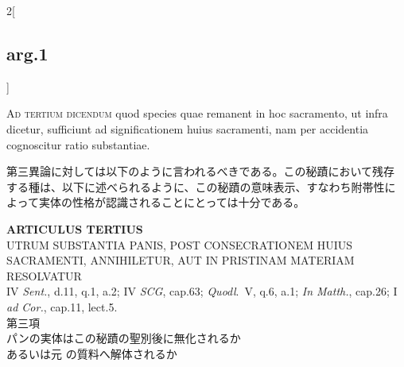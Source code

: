 \documentclass[paper=a4paper,fontsize=10pt,jafontsize=9pt,titlepage]{jlreq}
\begin{document}
\begin{paracol}{2}[\subsection{arg.1}]
\switchcolumn*[\subsection{ad.3}]

{\scshape Ad tertium dicendum} quod species quae remanent in hoc
sacramento, ut infra dicetur, sufficiunt ad significationem huius
sacramenti, nam per accidentia cognoscitur ratio substantiae.

\switchcolumn

第三異論に対しては以下のように言われるべきである。この秘蹟において残存
する種は、以下に述べられるように、この秘蹟の意味表示、すなわち附帯性に
よって実体の性格が認識されることにとっては十分である。

\end{paracol}
\newpage
{}
{}
\setcounter{section}{3}
\setcounter{subsection}{0}




\begin{center}
{\Large {\bfseries ARTICULUS TERTIUS}}\\ {\large UTRUM SUBSTANTIA PANIS,
POST CONSECRATIONEM HUIUS SACRAMENTI, ANNIHILETUR, AUT IN PRISTINAM
MATERIAM RESOLVATUR}\\ {\footnotesize IV {\itshape Sent.}, d.11, q.1,
a.2; IV {\itshape SCG}, cap.63; {\itshape Quodl}.~V, q.6, a.1;
{\itshape In Matth.}, cap.26; I {\itshape ad Cor.}, cap.11, lect.5.}\\
{\Large 第三項\\パンの実体はこの秘蹟の聖別後に無化されるか\\あるいは元
の質料へ解体されるか}
\end{center}
\end{document}
